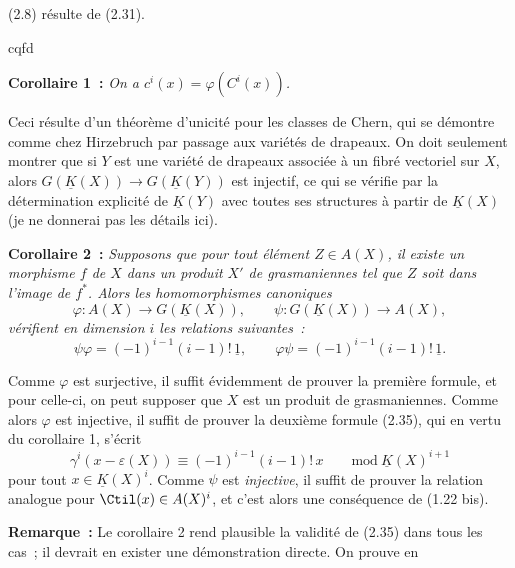 (2.8) résulte de (2.31).
\begin{flushright}cqfd\end{flushright}

\textbf{Corollaire 1~:} \emph{On a $c^i(x)=\varphi(C^i(x))$.}

Ceci résulte d'un théorème d'unicité pour les classes de Chern, qui se démontre comme chez Hirzebruch par passage aux variétés de drapeaux. On doit seulement montrer que si $Y$ est une variété de drapeaux associée à un fibré vectoriel sur $X$, alors $G(\underline K(X))\longrightarrow G(\underline K(Y))$ est injectif, ce qui se vérifie par la détermination explicité de $\underline K(Y)$ avec toutes ses structures à partir de $\underline K(X)$ (je ne donnerai pas les détails ici).

\textbf{Corollaire 2~:} \emph{Supposons que pour tout élément $Z\in A(X)$, il existe un morphisme $f$ de $X$ dans un produit $X'$ de grasmaniennes tel que $Z$ soit dans l'image de $f^*$. Alors les homomorphismes canoniques}
\[
 \varphi:A(X)\longrightarrow G(\underline K(X)),\qquad \psi:G(\underline K(X))\longrightarrow A(X),
\]
\emph{vérifient en dimension $i$ les relations suivantes~:}
\begin{equation}\tag{2.35}
 \psi\varphi=(-1)^{i-1}(i-1)!\,\underline 1,\qquad
 \varphi\psi=(-1)^{i-1}(i-1)!\,\underline 1.
\end{equation}

Comme $\varphi$ est surjective, il suffit évidemment de prouver la première formule, et pour celle-ci, on peut supposer que $X$ est un produit de grasmaniennes. Comme alors $\varphi$ est injective, il suffit de prouver la deuxième formule (2.35), qui en vertu du corollaire 1, s'écrit
\[
 \gamma^i(x-\varepsilon(X))\equiv(-1)^{i-1}(i-1)!\,x\qquad\mathrm{mod}\ \underline K(X)^{i+1}
\]
pour tout $x\in\underline K(X)^i$. Comme $\psi$ est \emph{injective}, il suffit de prouver la relation analogue pour $\Ctil(x)\in A(X)^i$, et c'est alors une conséquence de (1.22 bis).

\textbf{Remarque~:} Le corollaire 2 rend plausible la validité de (2.35) dans tous les cas~; il devrait en exister une démonstration directe. On prouve en
